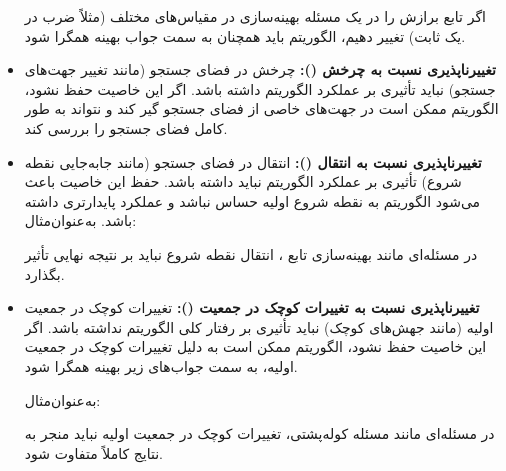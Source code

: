 \documentclass[12pt]{exam}
\begin{document}
\begin{questions}
\begin{itemize}
	 	اگر تابع برازش را در یک مسئله بهینه‌سازی در مقیاس‌های مختلف (مثلاً ضرب در یک ثابت) تغییر دهیم، الگوریتم باید همچنان به سمت جواب بهینه همگرا شود.
	 	
	 	\item \textbf{تغییرناپذیری نسبت به چرخش ():}
	 	چرخش در فضای جستجو (مانند تغییر جهت‌های جستجو) نباید تأثیری بر عملکرد الگوریتم داشته باشد. اگر این خاصیت حفظ نشود، الگوریتم ممکن است در جهت‌های خاصی از فضای جستجو گیر کند و نتواند به طور کامل فضای جستجو را بررسی کند.
	 	
	 	\item \textbf{ تغییرناپذیری نسبت به انتقال ():}
	 	انتقال در فضای جستجو (مانند جابه‌جایی نقطه شروع) تأثیری بر عملکرد الگوریتم نباید داشته باشد. حفظ این خاصیت باعث می‌شود الگوریتم به نقطه شروع اولیه حساس نباشد و عملکرد پایدارتری داشته باشد.
	 	\newpage
	 	به‌عنوان‌مثال: 
	 	
	 	در مسئله‌ای مانند بهینه‌سازی تابع
	 	 ، انتقال نقطه شروع نباید بر نتیجه نهایی تأثیر بگذارد.
	 	
	 	\item \textbf{تغییرناپذیری نسبت به تغییرات کوچک در جمعیت ():}
	 	تغییرات کوچک در جمعیت اولیه (مانند جهش‌های کوچک) نباید تأثیری بر رفتار کلی الگوریتم نداشته باشد. اگر این خاصیت حفظ نشود، الگوریتم ممکن است به دلیل تغییرات کوچک در جمعیت اولیه، به سمت جواب‌های زیر بهینه همگرا شود.
	 	
	 	به‌عنوان‌مثال: 
	 	
	 	در مسئله‌ای مانند مسئله کوله‌پشتی، تغییرات کوچک در جمعیت اولیه نباید منجر به نتایج کاملاً متفاوت شود.
	 	
	 	
	 	
	 	
	 	
	 \end{itemize}

\end{questions}

				
	
	\newpage
\end{document}
